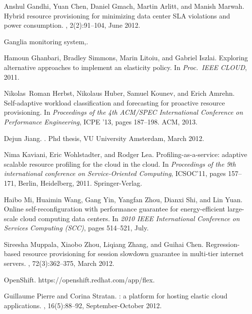 \documentclass{sig-alternate-10pt}
\begin{document}
\begin{thebibliography}{10}
Anshul Gandhi, Yuan Chen, Daniel Gmach, Martin Arlitt, and Manish Marwah.
\newblock Hybrid resource provisioning for minimizing data center {SLA}
  violations and power consumption.
, 2(2):91--104,
  June 2012.

{Ganglia monitoring system,}.

Hamoun Ghanbari, Bradley Simmons, Marin Litoiu, and Gabriel Iszlai.
\newblock Exploring alternative approaches to implement an elasticity policy.
\newblock In {\em Proc.\ IEEE CLOUD}, 2011.

Nikolas~Roman Herbst, Nikolaus Huber, Samuel Kounev, and Erich Amrehn.
\newblock Self-adaptive workload classification and forecasting for proactive
  resource provisioning.
\newblock In {\em Proceedings of the 4th ACM/SPEC International Conference on
  Performance Engineering}, ICPE '13, pages 187--198. ACM, 2013.

Dejun Jiang.
.
\newblock Phd thesis, VU University Amsterdam, March 2012.

Nima Kaviani, Eric Wohlstadter, and Rodger Lea.
\newblock Profiling-as-a-service: adaptive scalable resource profiling for the
  cloud in the cloud.
\newblock In {\em Proceedings of the 9th international conference on
  Service-Oriented Computing}, {ICSOC'11}, pages 157--171, Berlin, Heidelberg,
  2011. Springer-Verlag.

Haibo Mi, Huaimin Wang, Gang Yin, Yangfan Zhou, Dianxi Shi, and Lin Yuan.
\newblock Online self-reconfiguration with performance guarantee for
  energy-efficient large-scale cloud computing data centers.
\newblock In {\em 2010 {IEEE} International Conference on Services Computing
  ({SCC)}}, pages 514--521, July.

Sireesha Muppala, Xiaobo Zhou, Liqiang Zhang, and Guihai Chen.
\newblock Regression-based resource provisioning for session slowdown guarantee
  in multi-tier internet servers.
, 72(3):362--375,
  March 2012.

{OpenShift. https://openshift.redhat.com/app/flex}.

Guillaume Pierre and Corina Stratan.
: a platform for hosting elastic cloud applications.
, 16(5):88--92, September-October 2012.


\end{thebibliography}
\end{document}
